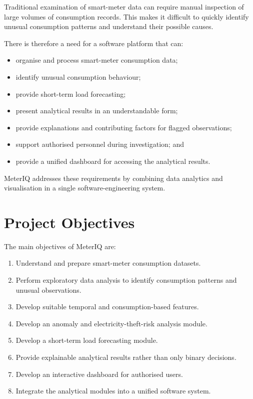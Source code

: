\documentclass{tietreport}
\begin{document}
Traditional examination of smart-meter data can require manual inspection of
large volumes of consumption records. This makes it difficult to quickly
identify unusual consumption patterns and understand their possible causes.

There is therefore a need for a software platform that can:

\begin{itemize}
    \item organise and process smart-meter consumption data;
    \item identify unusual consumption behaviour;
    \item provide short-term load forecasting;
    \item present analytical results in an understandable form;
    \item provide explanations and contributing factors for flagged observations;
    \item support authorised personnel during investigation; and
    \item provide a unified dashboard for accessing the analytical results.
\end{itemize}

MeterIQ addresses these requirements by combining data analytics and
visualisation in a single software-engineering system.

\section{Project Objectives}

The main objectives of MeterIQ are:

\begin{enumerate}
    \item Understand and prepare smart-meter consumption datasets.
    \item Perform exploratory data analysis to identify consumption patterns
    and unusual observations.
    \item Develop suitable temporal and consumption-based features.
    \item Develop an anomaly and electricity-theft-risk analysis module.
    \item Develop a short-term load forecasting module.
    \item Provide explainable analytical results rather than only binary
    decisions.
    \item Develop an interactive dashboard for authorised users.
    \item Integrate the analytical modules into a unified software system.
\end{enumerate}
\end{document}
